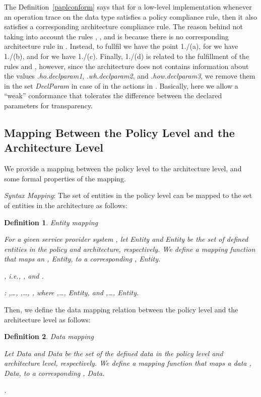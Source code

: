 \documentclass[a4paper]{article}
\newtheorem{ttd}{Definition}
\begin{document}
The Definition~\ref{paplconform} says that for a low-level implementation whenever an operation trace  on the data type  satisfies a policy compliance rule, then it also satisfies a corresponding architecture compliance rule. The reason behind not taking into account the rules , , and  is because there is no corresponding architecture rule in . Instead, to fullfil  we have the point 1./(a), for       we have 1./(b), and for  we have 1./(c).  Finally, 1./(d) is related to the fulfillment of the rules  and , however, since the architecture does not contains information about the values .\textit{ho}.\textit{declparam1}, .\textit{wh}.\textit{declparam2}, and .\textit{how}.\textit{declparam3}, we remove them in the set \textit{DeclParam} in case of  in the actions in .  Basically, here we allow a ``weak'' conformance that tolerates the difference between the declared parameters for transparency.  

\subsection{Mapping Between the Policy Level and the Architecture Level}
\label{mapping}

We provide a mapping between the policy level to the architecture level, and some formal properties of the mapping. 

\textit{Syntax Mapping}: The set of entities in the policy level can be mapped to the set of entities in the architecture as follows: 

\begin{ttd} Entity mapping

\noindent For a given service provider system , let \textit{Entity}  and  \textit{Entity} be the set of defined entities in the policy and architecture, respectively.  
We define a mapping function  that maps an ,   \textit{Entity}, to a corresponding ,   \textit{Entity}.       

\begin{center}
    , i.e.,   , and    .

: ,\dots,     ,\dots, , where ,\dots,   \textit{Entity}, and ,\dots,   \textit{Entity}. 
\end{center}

\end{ttd}

Then, we define the data mapping relation between the policy level and the architecture level as follows: 

\begin{ttd} Data mapping
    
\noindent Let Data and Data be the set of the defined data in the policy level and architecture level, respectively. 
We define a mapping function  that maps a data ,   \textit{Data}, to a corresponding ,   \textit{Data}.       

\begin{center}
    .

\end{center}    
\end{ttd} 
\end{document}

